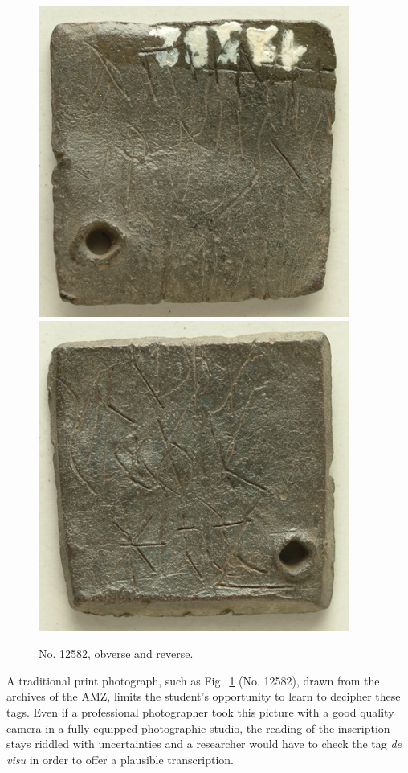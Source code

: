 \documentclass[amsthm,ebook]{saparticle}
\begin{document}
\begin{figure}[!h]
\centering
\includegraphics[scale=0.25]{EAGLE16lameetalteaching-img002.jpg}
\includegraphics[scale=0.25]{EAGLE16lameetalteaching-img001.jpg}
\caption{No. 12582, obverse and reverse.}
\label{fig:12582}
\end{figure}

\newpage
A traditional print photograph, such as Fig.~\ref{fig:12582} (No. 12582), drawn from the archives of the AMZ, limits the student’s
opportunity to learn to decipher these tags. Even if a professional photographer took this picture with a good quality
camera in a fully equipped photographic studio, the reading of the inscription stays riddled with uncertainties and a
researcher would have to check the tag \emph{de visu} in order to offer a plausible transcription.
\end{document}
